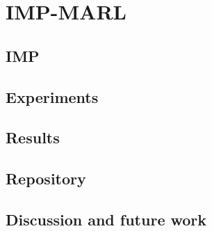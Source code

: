 \chapter{IMP-MARL}\label{ch:impmarl}

\section{IMP}
\section{Experiments}
\section{Results}
\section{Repository}
\section{Discussion and future work}
